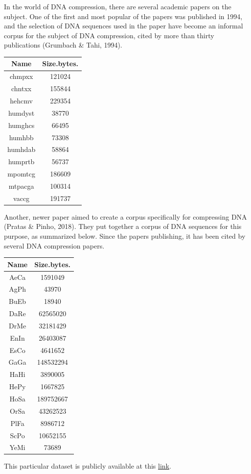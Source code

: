 \documentclass[12pt,twoside]{reedthesis}
\begin{document}
In the world of DNA compression, there are several academic papers on the subject. One of the first and most popular of the papers was published in 1994, and the selection of DNA sequences used in the paper have become an informal corpus for the subject of DNA compression, cited by more than thirty publications (Grumbach \& Tahi, 1994).
\begin{longtable}[]{@{}cc@{}}
\toprule()
Name & Size.bytes. \\
\midrule()
\endhead
chmpxx & 121024 \\
chntxx & 155844 \\
hehcmv & 229354 \\
humdyst & 38770 \\
humghcs & 66495 \\
humhbb & 73308 \\
humhdab & 58864 \\
humprtb & 56737 \\
mpomtcg & 186609 \\
mtpacga & 100314 \\
vaccg & 191737 \\
\bottomrule()
\end{longtable}
Another, newer paper aimed to create a corpus specifically for compressing DNA (Pratas \& Pinho, 2018). They put together a corpus of DNA sequences for this purpose, as summarized below. Since the papers publishing, it has been cited by several DNA compression papers.
\begin{longtable}[]{@{}cc@{}}
\toprule()
Name & Size.bytes. \\
\midrule()
\endhead
AeCa & 1591049 \\
AgPh & 43970 \\
BuEb & 18940 \\
DaRe & 62565020 \\
DrMe & 32181429 \\
EnIn & 26403087 \\
EsCo & 4641652 \\
GaGa & 148532294 \\
HaHi & 3890005 \\
HePy & 1667825 \\
HoSa & 189752667 \\
OrSa & 43262523 \\
PlFa & 8986712 \\
ScPo & 10652155 \\
YeMi & 73689 \\
\bottomrule()
\end{longtable}
This particular dataset is publicly available at this \href{https://tinyurl.com/DNAcorpus}{link}.
\end{document}
